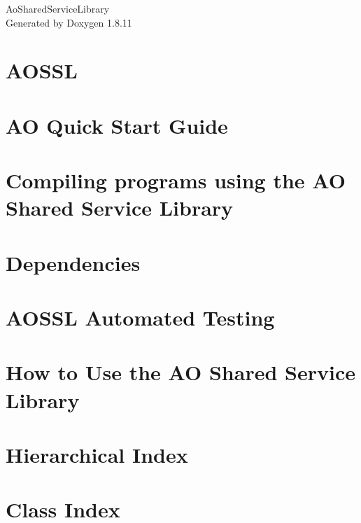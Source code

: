 \documentclass[twoside]{book}
\newcommand{\+}{\discretionary{\mbox{\scriptsize$\hookleftarrow$}}{}{}}
\newcommand{\clearemptydoublepage}{%
  \newpage{\pagestyle{empty}\cleardoublepage}%
}
\begin{document}
\hypersetup{pageanchor=false,
             bookmarksnumbered=true,
             pdfencoding=unicode
            }
\begin{titlepage}
\vspace*{7cm}
\begin{center}%
{\Large Ao\+Shared\+Service\+Library }\\
\vspace*{1cm}
{\large Generated by Doxygen 1.8.11}\\
\end{center}
\end{titlepage}
\clearemptydoublepage
\tableofcontents
\clearemptydoublepage
{}
\hypersetup{pageanchor=true}

\chapter{A\+O\+S\+SL}
\label{index}\hypertarget{index}{}
\chapter{AO Quick Start Guide}
\label{quickstart}
\hypertarget{quickstart}{}

\chapter{Compiling programs using the AO Shared Service Library}
\label{compilation}
\hypertarget{compilation}{}

\chapter{Dependencies}
\label{dependencies}
\hypertarget{dependencies}{}

\chapter{A\+O\+S\+SL Automated Testing}
\label{tests}
\hypertarget{tests}{}

\chapter{How to Use the AO Shared Service Library}
\label{use_index}
\hypertarget{use_index}{}

\chapter{Hierarchical Index}

\chapter{Class Index}

\end{document}
